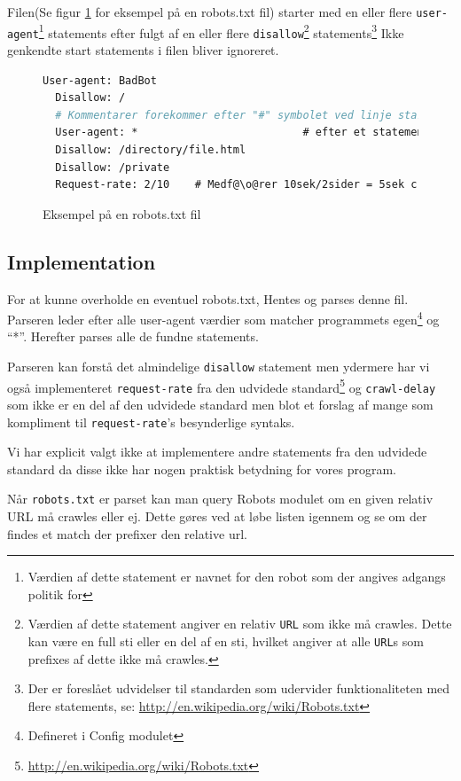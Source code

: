 \documentclass[a4paper,oneside]{memoir}
\begin{document}
Filen(Se figur \ref{eksrobotstxtfile} for eksempel på en robots.txt fil) starter
med en eller flere \texttt{user-agent}\footnote{Værdien af dette
statement er navnet for den robot som der angives adgangs politik for}
statements efter fulgt af en eller flere \texttt{disallow}\footnote{Værdien af
dette statement angiver en relativ \texttt{URL} som ikke må crawles. Dette kan
være en full sti eller en del af en sti, hvilket angiver at alle \texttt{URL}s
som prefixes af dette ikke må crawles.} statements\footnote{Der er foreslået
udvidelser til standarden som udervider funktionaliteten med flere statements,
se: \url{http://en.wikipedia.org/wiki/Robots.txt}} 
Ikke genkendte start statements i filen bliver ignoreret.

\begin{figure}[h]
\begin{lstlisting}[language=csh,
                   escapechar=\@]
  User-agent: BadBot
  Disallow: /
  # Kommentarer forekommer efter "#" symbolet ved linje start eller
  User-agent: *                          # efter et statement
  Disallow: /directory/file.html
  Disallow: /private 
  Request-rate: 2/10    # Medf@\o@rer 10sek/2sider = 5sek crawl delay
\end{lstlisting}

  \caption{Eksempel på en robots.txt fil}
  \label{eksrobotstxtfile}
\end{figure}


\subsection{Implementation}

For at kunne overholde en eventuel robots.txt, Hentes og parses denne fil.
Parseren leder efter alle user-agent værdier som matcher
programmets egen\footnote{Defineret i Config modulet} og ``*''. Herefter
parses alle de fundne statements.

Parseren kan forstå det almindelige \texttt{disallow} statement men
ydermere har vi også implementeret \texttt{request-rate} fra den udvidede
standard\footnote{\url{http://en.wikipedia.org/wiki/Robots.txt}} og
\texttt{crawl-delay} som ikke er en del af den udvidede standard men blot et
forslag af mange som kompliment til \texttt{request-rate}'s besynderlige
syntaks. 

Vi har explicit valgt ikke at implementere andre statements fra den
udvidede standard da disse ikke har nogen praktisk betydning for vores
program.

Når \texttt{robots.txt} er parset kan man query Robots modulet om en given
relativ URL må crawles eller ej. Dette gøres ved at løbe listen igennem
og se om der findes et match der prefixer den relative url.
\end{document}
